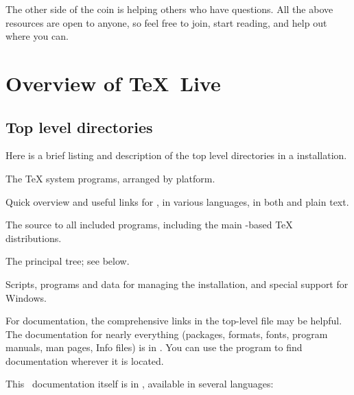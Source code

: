 \documentclass[12pt]{article}
\begin{document}
The other side of the coin is helping others who have questions.  All
the above resources are open to anyone, so feel free to join, start
reading, and help out where you can.


\section{Overview of \protect\TeX\protect\ Live}
\label{sec:overview-tl}

\subsection{Top level \protect\TL{} directories}
\label{sec:tld}

Here is a brief listing and description of the top level directories in a
\TL{} installation.  

\begin{ttdescription}
\item[bin] The \TeX{} system programs, arranged by platform.
%
\item[readme-*.dir] Quick overview and useful links for \TL{},
in various languages, in both \HTML{} and plain text.
%
\item[source] The source to all included programs, including the main
  \Webc{}-based \TeX{} distributions.
%
\item[texmf-dist] The principal tree; see  below.
%
\item[tlpkg] Scripts, programs and data for managing the
  installation, and special support for Windows.
\end{ttdescription}

For documentation, the comprehensive links in the top-level file
 may be helpful.  The documentation for nearly everything
(packages, formats, fonts, program manuals, man pages, Info files) is in
.  You can use the  program to
find documentation wherever it is located.

This \TL\ documentation itself is in ,
available in several languages:
\end{document}
